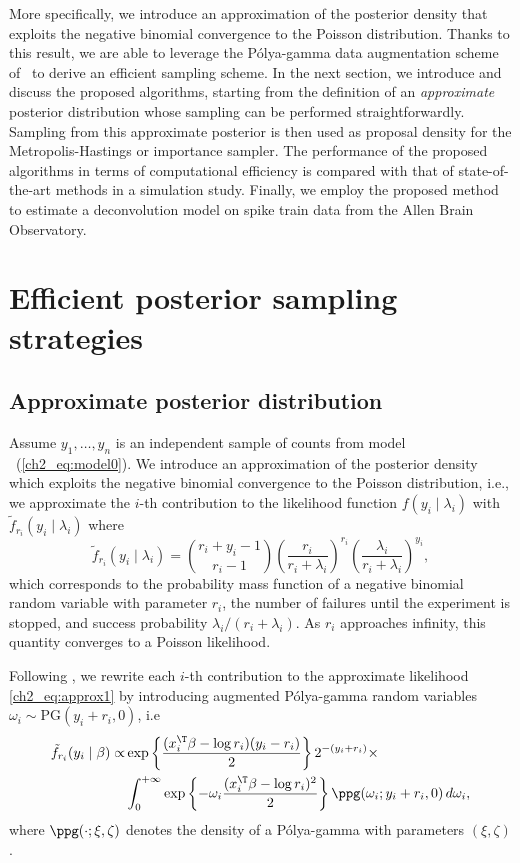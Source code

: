 More specifically, we introduce an approximation of the posterior density that exploits the negative binomial convergence to the Poisson distribution. Thanks to this result, we are able to leverage the P\'olya-gamma data augmentation scheme of~\textcite{polson_scott_2013} to derive an efficient sampling scheme. 
In the next section, we introduce and discuss the proposed algorithms, starting from the definition of an \emph{approximate} posterior distribution whose sampling can be performed straightforwardly.
Sampling from this approximate posterior is then used as proposal density for the Metropolis-Hastings or importance sampler. The performance of the proposed algorithms in terms of computational efficiency is compared with that of state-of-the-art methods in a simulation study. Finally, we employ the proposed method to estimate a deconvolution model on spike train data from the Allen Brain Observatory.


\vfill

\section{Efficient posterior sampling strategies}
\label{ch2_sec:2}

\subsection{Approximate posterior distribution}\label{ch2_sec:approx_distr}

Assume $y_1,\dots,y_n$ is an independent sample of counts from model ~(\ref{ch2_eq:model0}). 
We introduce an approximation of the posterior density which exploits the negative binomial convergence to the Poisson distribution, i.e., we approximate the $i$-th contribution to the likelihood function $f(y_i \mid \lambda_i)$ with $\tilde{f}_{r_i}(y_i \mid \lambda_i)$ where 
\begin{equation}
\tilde{f}_{r_i}(y_i \mid \lambda_i) = 
\binom{r_i + y_i -1}{r_i-1} \left( \frac{r_i}{r_i + \lambda_i}\right)^{r_i} \left(\frac{\lambda_i}{r_i+ \lambda_i}\right)^{y_i},
\label{ch2_eq:approx1}
\end{equation}
which corresponds to the probability mass function of a negative binomial random variable with parameter $r_i$, the number of failures until the experiment is stopped, and success probability $\lambda_i/(r_i+\lambda_i)$. As $r_i$ approaches infinity, this quantity converges to a Poisson likelihood.

Following \textcite{polson_scott_2013}, we rewrite each $i$-th contribution to the approximate likelihood \eqref{ch2_eq:approx1} by introducing augmented P\'olya-gamma random variables $\omega_i \sim \mbox{PG}(y_i+r_i,0)$, i.e
\begin{align*}
\tilde{f}_{r_i}(y_i \mid \beta) \propto & \exp\left\{ \frac{(x_i^\T \beta - \log r_i)(y_i-r_i)}{2} \right\} 2^{-(y_i+r_i)} \times \\ 
& \int_{0}^{+\infty} \exp\left\{-\omega_i\frac{(x_i^\T \beta - \log r_i)^2}{2} \right\} \ppg(\omega_i; y_i + r_i,0) \, d\omega_i,   
\end{align*}
where $\ppg(\cdot; \xi,\zeta)$ denotes the density of a P\'olya-gamma with parameters $( \xi,\zeta)$. 
%

